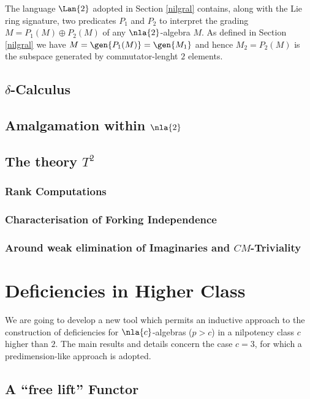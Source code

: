 \documentclass[a4paper,twoside,10pt,ngerman,english]{report}
\begin{document}
\smallskip
The language $\Lan{2}$ adopted in Section \ref{nilgral} contains,
along with the Lie ring signature, two predicates $P_{1}$ and $P_{2}$ to interpret the grading $M=P_{1}(M)\oplus P_{2}(M)$
of any $\nla{2}$-algebra $M$.
As defined in Section \ref{nilgral} we have $M=\gen{P_{1}(M)}=\gen{M_{1}}$ and hence $M_{2}=P_{2}(M)$ is the subspace
generated by commutator-lenght $2$ elements.
\section{$\delta$-Calculus}\label{deltadue}

\section{Amalgamation within $\nla{2}$}\label{amalga2}

\section{The theory $T^{2}$}\label{t2axioms}

\subsection{Rank Computations}\label{rango}

\subsection{Characterisation of Forking Independence}\label{forking}

\subsection{Around weak elimination of Imaginaries and $CM$-Triviality%
}\label{cmt}
\newpage
\thispagestyle{empty}
\cleardoublepage
\chapter{Deficiencies in Higher Class}\label{tre}
We are going to develop a new tool which permits an inductive approach to the construction
of deficiencies for $\nla{c}$-algebras ($p>c$) in a nilpotency class $c$ higher than $2$.
The main results and details concern the case $c=3$, for which a predimension-like approach is adopted.
\section{A ``free lift'' Functor}%
\label{freelift}

\end{document}
